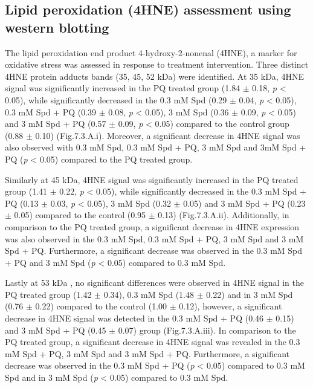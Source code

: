 
\subsection{Lipid peroxidation (4HNE) assessment using western blotting}
The lipid peroxidation end product 4-hydroxy-2-nonenal (4HNE), a marker for oxidative stress was assessed in response to treatment intervention. Three distinct 4HNE protein adducts bands (35, 45, 52 kDa) were identified. At 35 kDa, 4HNE signal was significantly increased in the PQ treated group (1.84 $\pm$ 0.18, \textit{p} < 0.05), while significantly decreased in the 0.3 mM Spd (0.29 $\pm$ 0.04, \textit{p} < 0.05), 0.3 mM Spd + PQ (0.39 $\pm$ 0.08, \textit{p} < 0.05), 3 mM Spd (0.36 $\pm$ 0.09, \textit{p} < 0.05) and 3 mM Spd + PQ (0.57 $\pm$ 0.09, \textit{p} < 0.05) compared to the control group (0.88 $\pm$ 0.10) (Fig.7.3.A.i). Moreover, a significant decrease in 4HNE signal was also observed with 0.3 mM Spd, 0.3 mM Spd + PQ, 3 mM Spd and 3mM Spd + PQ (\textit{p} < 0.05) compared to the PQ treated group. 

Similarly at 45 kDa, 4HNE signal was significantly increased in the PQ treated group (1.41 $\pm$ 0.22, \textit{p} < 0.05), while significantly decreased in the 0.3 mM Spd + PQ (0.13 $\pm$ 0.03, \textit{p} < 0.05), 3 mM Spd (0.32 $\pm$ 0.05) and 3 mM Spd + PQ (0.23 $\pm$ 0.05) compared to the control (0.95 $\pm$ 0.13) (Fig.7.3.A.ii). Additionally, in comparison to the PQ treated group, a significant decrease in 4HNE expression was also observed in the 0.3 mM Spd, 0.3 mM Spd + PQ, 3 mM Spd and 3 mM Spd + PQ. Furthermore, a significant decrease was observed in the 0.3 mM Spd + PQ and 3 mM Spd (\textit{p} < 0.05) compared to 0.3 mM Spd.

Lastly at 53 kDa , no significant differences were observed in 4HNE signal in the PQ treated group (1.42 $\pm$ 0.34), 0.3 mM Spd (1.48 $\pm$ 0.22) and in 3 mM Spd (0.76 $\pm$ 0.22) compared to the control (1.00 $\pm$ 0.12), however, a significant decrease in 4HNE signal was detected in the 0.3 mM Spd + PQ (0.46 $\pm$ 0.15) and 3 mM Spd + PQ (0.45 $\pm$ 0.07) group (Fig.7.3.A.iii). In comparison to the PQ treated group, a significant decrease in 4HNE signal was revealed in the 0.3 mM Spd + PQ, 3 mM Spd and 3 mM Spd + PQ. Furthermore, a significant decrease was observed in the 0.3 mM Spd + PQ (\textit{p} < 0.05) compared to 0.3 mM Spd and in 3 mM Spd (\textit{p} < 0.05) compared to 0.3 mM Spd. 



